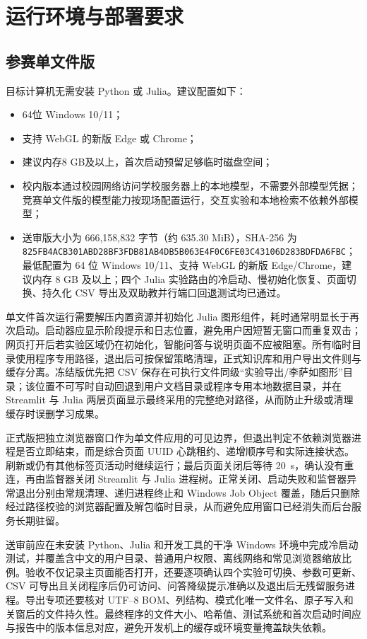 \documentclass[UTF8,a4paper,zihao=-4]{ctexart}
\begin{document}
\section{运行环境与部署要求}

\subsection{参赛单文件版}
目标计算机无需安装 Python 或 Julia。建议配置如下：
\begin{itemize}
  \item 64位 Windows 10/11；
  \item 支持 WebGL 的新版 Edge 或 Chrome；
  \item 建议内存8 GB及以上，首次启动预留足够临时磁盘空间；
  \item 校内版本通过校园网络访问学校服务器上的本地模型，不需要外部模型凭据；竞赛单文件版的模型能力按现场配置运行，交互实验和本地检索不依赖外部模型；
  \item 送审版大小为 666,158,832 字节（约 635.30 MiB），SHA-256 为 \texttt{825FB4AC\allowbreak{}B301ABD2\allowbreak{}8BF3FDB8\allowbreak{}1AB4DB5B\allowbreak{}063E4F0C\allowbreak{}6FE03C43\allowbreak{}106D283B\allowbreak{}DFDA6FBC}；最低配置为 64 位 Windows 10/11、支持 WebGL 的新版 Edge/Chrome，建议内存 8 GB 及以上；四个 Julia 实验路由的冷启动、慢初始化恢复、页面切换、持久化 CSV 导出及双助教并行端口回退测试均已通过。
\end{itemize}

单文件首次运行需要解压内置资源并初始化 Julia 图形组件，耗时通常明显长于再次启动。启动器应显示阶段提示和日志位置，避免用户因短暂无窗口而重复双击；网页打开后若实验区域仍在初始化，智能问答与说明页面不应被阻塞。所有临时目录使用程序专用路径，退出后可按保留策略清理，正式知识库和用户导出文件则与缓存分离。冻结版优先把 CSV 保存在可执行文件同级“实验导出/李萨如图形”目录；该位置不可写时自动回退到用户文档目录或程序专用本地数据目录，并在 Streamlit 与 Julia 两层页面显示最终采用的完整绝对路径，从而防止升级或清理缓存时误删学习成果。

正式版把独立浏览器窗口作为单文件应用的可见边界，但退出判定不依赖浏览器进程是否立即结束，而是综合页面 UUID 心跳租约、递增顺序号和实际连接状态。刷新或仍有其他标签页活动时继续运行；最后页面关闭后等待 20~s，确认没有重连，再由监督器关闭 Streamlit 与 Julia 进程树。正常关闭、启动失败和监督器异常退出分别由常规清理、递归进程终止和 Windows Job Object 覆盖，随后只删除经过路径校验的浏览器配置及解包临时目录，从而避免应用窗口已经消失而后台服务长期驻留。

送审前应在未安装 Python、Julia 和开发工具的干净 Windows 环境中完成冷启动测试，并覆盖含中文的用户目录、普通用户权限、离线网络和常见浏览器缩放比例。验收不仅记录主页面能否打开，还要逐项确认四个实验可切换、参数可更新、CSV 可导出且关闭程序后仍可访问、问答降级提示准确以及退出后无残留服务进程。导出专项还要核对 UTF--8 BOM、列结构、模式化唯一文件名、原子写入和关窗后的文件持久性。最终程序的文件大小、哈希值、测试系统和首次启动时间应与报告中的版本信息对应，避免开发机上的缓存或环境变量掩盖缺失依赖。
\end{document}

